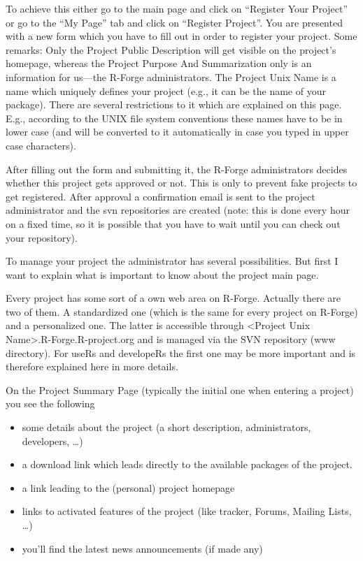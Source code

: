 To achieve this either go to the main page and click on ``Register
Your Project'' or go to the ``My Page'' tab and click on ``Register
Project''. You are presented with a new form which you have to fill
out in order to register your project. Some remarks: Only the Project
Public Description will get visible on the project's homepage, whereas
the Project Purpose And Summarization only is an information for
us---the R-Forge administrators. The Project Unix Name is a name which
uniquely defines your project (e.g., it can be the name of your
package). There are several restrictions to it which are explained on this
page. E.g., according to the UNIX
file system conventions these names have to be in lower case (and will
be converted to it automatically in case you typed in upper case
characters).

After filling out the form and submitting it, the R-Forge
administrators decides whether this project gets approved or not. This
is only to prevent fake projects to get registered. After approval a
confirmation email is sent to the project administrator and the svn
repositories are created (note: this is done every hour on a fixed
time, so it is possible that you have to wait until you can check out
your repository).

To manage your project the administrator has several
possibilities. But first I want to explain what is important to know
about the project main page.

Every project has some sort of a own web area on R-Forge. Actually
there are two of them. A standardized one (which is the same for every
project on R-Forge) and a personalized one. The latter is accessible
through <Project Unix Name>.R-Forge.R-project.org and is managed via
the SVN repository (www directory). For useRs and developeRs the first
one may be more important and is therefore explained here in more
details.

On the Project Summary Page (typically the initial one when entering a
project) you see the following

\begin{itemize}
\item some details about the project (a short description,
  administrators, developers, \ldots{})

\item a download link which leads directly to the available packages
  of the project.
\item a link leading to the (personal) project homepage

\item links to activated features of the project (like tracker,
  Forums, Mailing Lists, \ldots{})

\item you'll find the latest news announcements (if made any)

\end{itemize}

